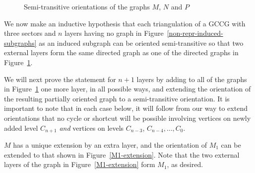 \documentclass[12pt]{article}
\numberwithin{equation}{section}
\begin{document}
\begin{figure}[!htbp]
\begin{center}
\caption{Semi-transitive orientations of the graphs $M$, $N$ and $P$}\label{induction-base-case}
\end{center}
\end{figure}

We now make an inductive hypothesis that each triangulation of a GCCG with three sectors and $n$ layers having no graph in Figure~\ref{non-repr-induced-subgraphs} as an induced subgraph can be oriented semi-transitive so that two external layers form the same directed graph as one of the directed graphs in Figure~\ref{induction-base-case}.

We will next prove the statement for $n+1$ layers by adding to all of the graphs in Figure~\ref{induction-base-case}  one more layer, in all possible ways, and extending the orientation of the resulting partially oriented graph to a semi-transitive orientation.  It is important to note that in each case below, it will follow from our way to extend orientations that no cycle or shortcut will be possible involving vertices on newly added level $C_{n+1}$ {\em and} vertices on levels $C_{n-3}$, $C_{n-4},\ldots, C_0$.

$M$ has a unique extension by an extra layer, and the orientation of $M_1$ can be extended to that shown in Figure~\ref{M1-extension}. Note that the two external layers of the graph in Figure~\ref{M1-extension} form $M_1$, as desired.
\end{document}
